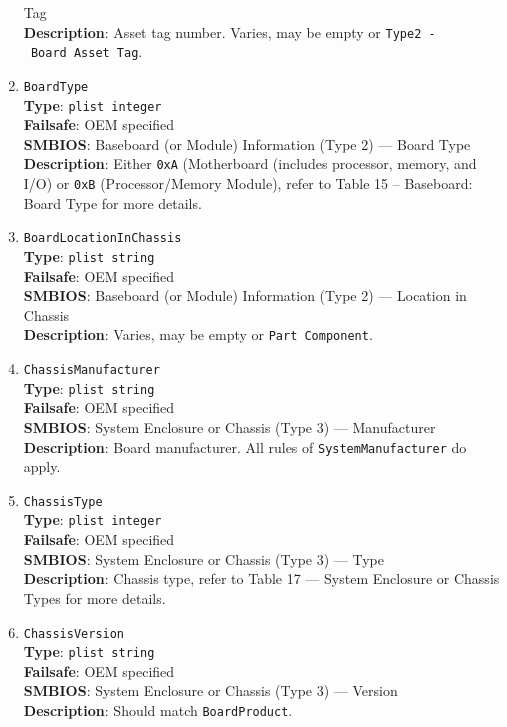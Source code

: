 \documentclass[]{article}
\begin{document}
\begin{enumerate}
  Tag\\
  \textbf{Description}: Asset tag number. Varies, may be empty or
  \texttt{Type2\ -\ Board\ Asset\ Tag}.
\item
  \texttt{BoardType}\\
  \textbf{Type}: \texttt{plist\ integer}\\
  \textbf{Failsafe}: OEM specified\\
  \textbf{SMBIOS}: Baseboard (or Module) Information (Type 2) --- Board
  Type\\
  \textbf{Description}: Either \texttt{0xA} (Motherboard (includes
  processor, memory, and I/O) or \texttt{0xB} (Processor/Memory Module),
  refer to Table 15 -- Baseboard: Board Type for more details.
\item
  \texttt{BoardLocationInChassis}\\
  \textbf{Type}: \texttt{plist\ string}\\
  \textbf{Failsafe}: OEM specified\\
  \textbf{SMBIOS}: Baseboard (or Module) Information (Type 2) --- Location
  in Chassis\\
  \textbf{Description}: Varies, may be empty or
  \texttt{Part\ Component}.
\item
  \texttt{ChassisManufacturer}\\
  \textbf{Type}: \texttt{plist\ string}\\
  \textbf{Failsafe}: OEM specified\\
  \textbf{SMBIOS}: System Enclosure or Chassis (Type 3) --- Manufacturer\\
  \textbf{Description}: Board manufacturer. All rules of
  \texttt{SystemManufacturer} do apply.
\item
  \texttt{ChassisType}\\
  \textbf{Type}: \texttt{plist\ integer}\\
  \textbf{Failsafe}: OEM specified\\
  \textbf{SMBIOS}: System Enclosure or Chassis (Type 3) --- Type\\
  \textbf{Description}: Chassis type, refer to Table 17 --- System
  Enclosure or Chassis Types for more details.
\item
  \texttt{ChassisVersion}\\
  \textbf{Type}: \texttt{plist\ string}\\
  \textbf{Failsafe}: OEM specified\\
  \textbf{SMBIOS}: System Enclosure or Chassis (Type 3) --- Version\\
  \textbf{Description}: Should match \texttt{BoardProduct}.

\end{enumerate}
\end{document}
